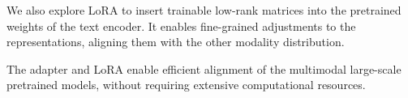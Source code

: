  We also explore LoRA to insert trainable low-rank matrices into the pretrained weights of the text encoder. It enables fine-grained adjustments to the representations, aligning them with the other modality distribution. 

The adapter and LoRA enable efficient alignment of the multimodal large-scale pretrained models, without requiring extensive computational resources.


 
 
